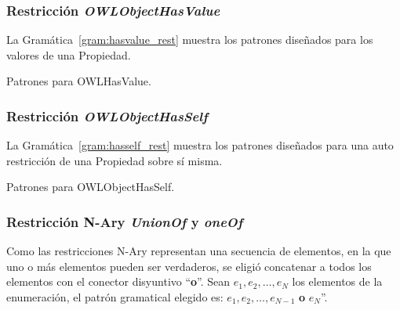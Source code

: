 \subsubsection{Restricción \emph{OWLObjectHasValue}}
La Gramática~\ref{gram:hasvalue_rest} muestra los patrones diseñados para los valores de una Propiedad.

\begin{GrammarEnv}
\begin{grammar}
\end{grammar}
\caption{Patrones para OWLHasValue.}\label{gram:hasvalue_rest}
\end{GrammarEnv}

\subsubsection{Restricción \emph{OWLObjectHasSelf}}
La Gramática~\ref{gram:hasself_rest} muestra los patrones diseñados para una auto restricción de una Propiedad sobre sí misma.

\begin{GrammarEnv}
\begin{grammar}
\end{grammar}
\caption{Patrones para OWLObjectHasSelf.}\label{gram:hasself_rest}
\end{GrammarEnv}


\subsubsection{Restricción N-Ary \emph{UnionOf} y \emph{oneOf}} 
Como las restricciones N-Ary representan una secuencia de elementos, en la que uno o más elementos pueden ser verdaderos, se eligió concatenar a todos los elementos con el conector disyuntivo ``\textbf{o}''.  
Sean $e_1, e_2,\ldots,e_N$ los elementos de la enumeración, el patrón gramatical elegido es: $e_1, e_2,\ldots,e_{N-1}$ {\textbf{o}} $e_N$''.

